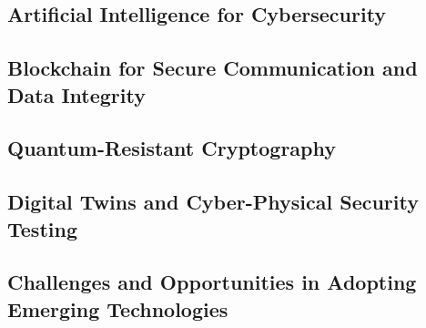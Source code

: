 \subsection{Artificial Intelligence for Cybersecurity}\label{subsec:artificial-intelligence-for-cybersecurity-in-avs}




\subsection{Blockchain for Secure Communication and Data Integrity}\label{subsec:blockchain-for-secure-communication-and-data-integrity}
\subsection{Quantum-Resistant Cryptography}\label{subsec:quantum-resistant-cryptography-in-future-avs}
\subsection{Digital Twins and Cyber-Physical Security Testing}\label{subsec:digital-twins-and-cyber-physical-security-testing}
\subsection{Challenges and Opportunities in Adopting Emerging Technologies}\label{subsec:challenges-and-opportunities-in-adopting-emerging-technologies}

